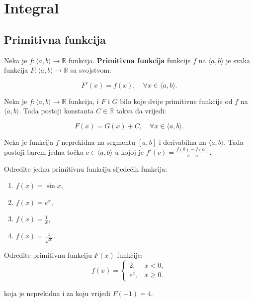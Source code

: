\section{Integral}

\subsection{Primitivna funkcija}
Neka je $f: \langle a, b \rangle \to \mathbb{R}$ funkcija.
\textbf{Primitivna funkcija} funkcije $f$ na $\langle a, b \rangle$ je svaka
funkcija $F: \langle a, b \rangle \to \mathbb{R}$ sa svojstvom:

$$
F'(x) = f(x),\quad\forall x \in \langle a, b \rangle.
$$

\begin{theorem}
    Neka je $f: \langle a, b \rangle \to \mathbb{R}$ funkcija, i $F$ i $G$
    bilo koje dvije primitivne funkcije od $f$ na $\langle a, b \rangle$. Tada
    postoji konstanta $C\in\mathbb{R}$ takva da vrijedi:

    $$
    F(x) = G(x) + C,\quad\forall x \in \langle a, b \rangle.
    $$
\end{theorem}

\begin{theorem}
    Neka je funkcija $f$ neprekidna na segmentu $[a, b]$ i derivabilna na
    $\langle a, b\rangle$. Tada postoji barem jedna točka $c \in\langle a,
    b\rangle$ u kojoj je $f'(c)=\frac{f(b)-f(a)}{b-a}$.
\end{theorem}

\begin{example}
    Odredite jednu primitivnu funkciju sljedećih funkcija:
    \begin{enumerate}
        \item $f(x) = \sin x$,
        \item $f(x) = e^x$,
        \item $f(x) = {\frac{1}{x}}$,
        \item $f(x) = {\frac{1}{\sqrt{x}}}$.
    \end{enumerate}
\end{example}

\begin{example}
    Odredite primitivnu funkciju $F(x)$ funkcije:
    $$
        f(x) = \begin{cases}
            2, & x < 0, \\
            e^x, & x \geq 0.
        \end{cases}
    $$

    koja je neprekidna i za koju vrijedi $F(-1) = 4$.
\end{example}

